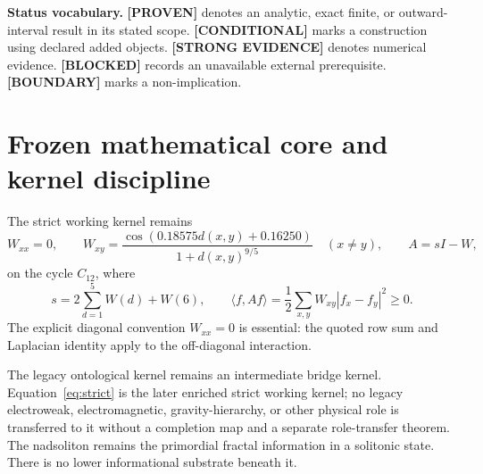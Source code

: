 \documentclass[11pt,a4paper]{article}
\newcommand{\proven}{\textcolor{green!40!black}{\textbf{[PROVEN]}}}
\newcommand{\strong}{\textcolor{blue!70!black}{\textbf{[STRONG EVIDENCE]}}}
\newcommand{\conditional}{\textcolor{violet!65!black}{\textbf{[CONDITIONAL]}}}
\newcommand{\blocked}{\textcolor{orange!82!black}{\textbf{[BLOCKED]}}}
\newcommand{\boundarymark}{\textcolor{orange!82!black}{\textbf{[BOUNDARY]}}}
\begin{document}
\begin{abstract}
ST197 certifies a complete $7^3$ nuisance cover to halfwidth $0.00013045$; at $0.00013050$ six cells fail the fixed certificate, which is a method boundary rather than proof of branch loss. ST198 proves that reconstructing a mode attenuated by $2^{-n}$ requires leading sample count proportional to $4^n$; at $n=12$ the displayed estimation lower bound exceeds $4.19\times10^{10}$. ST199 projects noisy Clifford-like generators onto an exact $M_2$ factor by matrix signs. ST200 encloses observed hidden-HMM coefficients through $n=12$ using exact rational forward likelihoods and outward integer-square-root bounds. ST201 upgrades the prior reset evidence to interval-certified no-go theorems for both the four-SWAP span and the complete 60-dimensional corresponding-pair Pauli span. ST202 correctly remains blocked because no external immutable laboratory record exists.

No strict fractal scale law, Planck scale, spacetime projection, canonical selector, physical dimensions, external evidence, legacy-to-strict completion or role transfer, Standard Model, gravity, $L_{\rm total}$, or Theory-of-Everything closure is claimed.
\end{abstract}

\textbf{Status vocabulary.} \proven{} denotes an analytic, exact finite, or outward-interval result in its stated scope. \conditional{} marks a construction using declared added objects. \strong{} denotes numerical evidence. \blocked{} records an unavailable external prerequisite. \boundarymark{} marks a non-implication.

\tableofcontents
\newpage

\section{Frozen mathematical core and kernel discipline}

The strict working kernel remains
\begin{equation}
W_{xx}=0,\qquad
W_{xy}=\frac{\cos(0.18575d(x,y)+0.16250)}{1+d(x,y)^{9/5}}\quad(x\ne y),
\qquad A=sI-W,
\label{eq:strict}
\end{equation}
on the cycle $C_{12}$, where
\[
s=2\sum_{d=1}^{5}W(d)+W(6),\qquad
\langle f,Af\rangle=\frac12\sum_{x,y}W_{xy}|f_x-f_y|^2\ge0.
\]
The explicit diagonal convention $W_{xx}=0$ is essential: the quoted row sum and Laplacian identity apply to the off-diagonal interaction.

The legacy ontological kernel remains an intermediate bridge kernel. Equation~\eqref{eq:strict} is the later enriched strict working kernel; no legacy electroweak, electromagnetic, gravity-hierarchy, or other physical role is transferred to it without a completion map and a separate role-transfer theorem. The nadsoliton remains the primordial fractal information in a solitonic state. There is no lower informational substrate beneath it.
\end{document}
